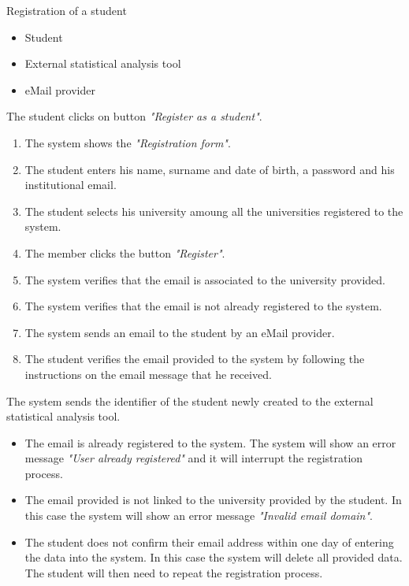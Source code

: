 \usecase
{Registration of a student}
{
    \begin{itemize}
        \item Student
        \item External statistical analysis tool
        \item eMail provider
    \end{itemize}
}
{
    The student clicks on button \textit{"Register as a student"}.
}
{
    \begin{enumerate}
        \item The system shows the \textit{"Registration form"}.
        \item The student enters his name, surname and date of birth, a password and his institutional email.
        \item The student selects his university amoung all the universities registered to the system.
        \item The member clicks the button \textit{"Register"}.
        \item The system verifies that the email is associated to the university provided.
        \item The system verifies that the email is not already registered to the system.
        \item The system sends an email to the student by an eMail provider.
        \item The student verifies the email provided to the system by following the instructions on the email message that he received.
    \end{enumerate}
}
{
    The system sends the identifier of the student newly created to the external statistical analysis tool.
}
{
    \begin{itemize}
        \item The email is already registered to the system. The system will show an error message \textit{"User already registered"} and it will interrupt the registration process.
        \item The email provided is not linked to the university provided by the student. In this case the system will show an error message \textit{"Invalid email domain"}.
        \item The student does not confirm their email address within one day of entering the data into the system. In this case the system will delete all provided data. The student will then need to repeat the registration process.
    \end{itemize}
}
{

}


